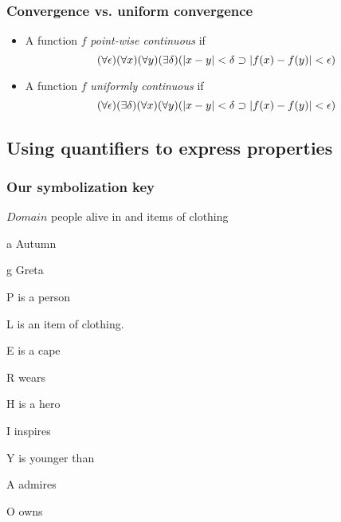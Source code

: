 \begin{frame}
    \frametitle{Convergence vs. uniform convergence}

\begin{itemize}[<+->]
\item A function $f$ \emph{point-wise continuous} if
\[
(\forall \epsilon)(\forall x)(\forall y)(\exists \delta)(\left|x - y\right| < \delta \supset \left|f(x) - f(y)\right| < \epsilon)
\]
\item A function $f$ \emph{uniformly continuous} if
\[
(\forall \epsilon) (\exists \delta) (\forall x)(\forall y)(\left|x - y\right| < \delta \supset \left|f(x) - f(y)\right| < \epsilon)
\]
\end{itemize}

\end{frame}

\subsection{Using quantifiers to express properties}

\begin{frame}
\frametitle{Our symbolization key}

    \begin{ekey}
    \item[$Domain$] people alive in \year{} and items of clothing
    \item[a] Autumn
    \item[g] Greta
    \item[P\qv{x}]  is a person
    \item[L\qv{x}]  is an item of clothing.
    \item[E\qv{x}]  is a cape
    \item[R\qr{x}{y}]  wears 
    \item[H\qv{x}]  is a hero
    \item[I\qv{x}]  inspires
    \item[Y\qr{x}{y}]  is younger than 
    \item[A\qr{x}{y}]  admires 
    \item[O\qr{x}{y}]  owns 
    \end{ekey}
\end{frame}


